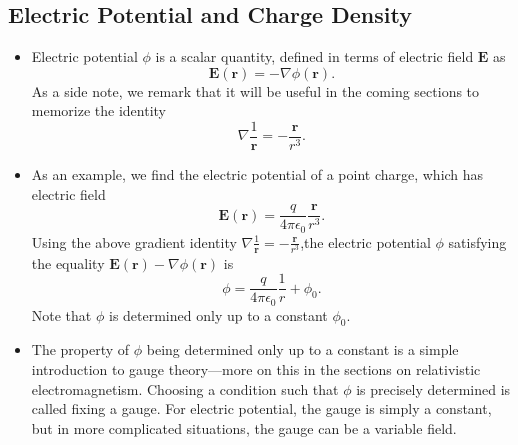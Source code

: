 \documentclass[11pt, a4paper]{article}
\renewcommand{\vec}[1]{\bm{#1}} %
\renewcommand{\r}{\vec{r}}
\newcommand{\E}{\vec{E}} %
\newcommand{\ee}{\epsilon_{0}}  %
\renewcommand{\grad}{\nabla}
\begin{document}
\subsection{Electric Potential and Charge Density}
\begin{itemize}
	\item Electric potential $ \phi $ is a scalar quantity, defined in terms of electric field $ \E $ as
	\begin{equation*}
		\E(\r) = - \grad \phi(\r).
	\end{equation*}
	As a side note, we remark that it will be useful in the coming sections to memorize the identity
	\begin{equation*}
		\grad \frac{1}{\r} = - \frac{\r}{r^{3}}.
	\end{equation*}
	
	\item As an example, we find the electric potential of a point charge, which has electric field
	\begin{equation*}
		\E(\r) = \frac{q}{4\pi \ee} \frac{\r}{r^{3}}.
	\end{equation*}
	Using the above gradient identity $ \grad \frac{1}{\r} = - \frac{\r}{r^{3}} $,the electric potential $ \phi $  satisfying the equality $ \E(\r)  -\grad \phi(\r) $ is
	\begin{equation*}
		\phi = \frac{q}{4\pi \ee}\frac{1}{r} + \phi_{0}.
	\end{equation*}
	Note that $ \phi $ is determined only up to a constant $ \phi_{0} $.
	
	\item The property of $ \phi $ being determined only up to a constant is a simple introduction to gauge theory---more on this in the sections on relativistic electromagnetism. Choosing a condition such that $ \phi $ is precisely determined is called fixing a gauge. For electric potential, the gauge is simply a constant, but in more complicated situations, the gauge can be a variable field.
	
\end{itemize}
\end{document}

